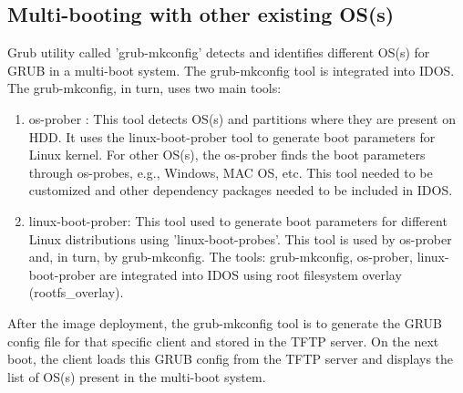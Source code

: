 \documentclass[a4paper,12pt]{article}
\begin{document}
\subsection{ Multi-booting with other existing OS(s)}
Grub utility called 'grub-mkconfig' detects and identifies different OS(s) for GRUB in a multi-boot system. The grub-mkconfig tool is integrated into IDOS. The grub-mkconfig, in turn, uses two main tools: 
\begin{enumerate}[label=\roman*.]

    \item os-prober \cite{osprober} : This tool detects OS(s) and partitions where they are present on HDD. It uses the linux-boot-prober tool to generate boot parameters for  Linux kernel. For other OS(s), the os-prober finds the boot parameters through os-probes, e.g., Windows, MAC OS, etc. This tool needed to be customized and other dependency packages needed to be included in IDOS.
    \item linux-boot-prober: This tool used to generate boot parameters for different Linux distributions using 'linux-boot-probes'. This tool is used by os-prober and, in turn, by grub-mkconfig.
    The tools: grub-mkconfig, os-prober, linux-boot-prober are integrated into IDOS using root filesystem overlay (rootfs\_overlay).
\end{enumerate}
After the image deployment, the grub-mkconfig tool is to generate the GRUB config file for that specific client and stored in the TFTP server. On the next boot, the client loads this GRUB config from the TFTP server and displays the list of OS(s) present in the multi-boot system.
\end{document}
